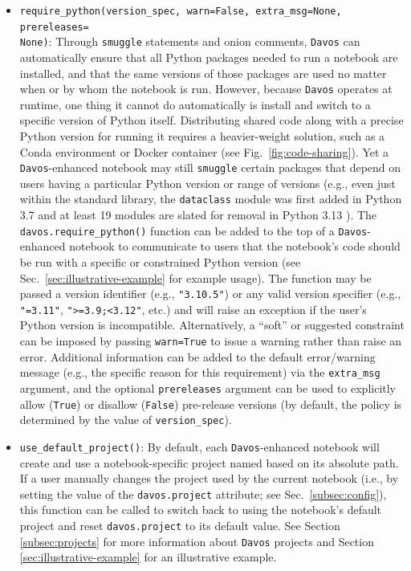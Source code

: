 \documentclass[preprint,12pt,a4paper]{elsarticle}
\begin{document}
\begin{itemize}
\item \texttt{require\_python(version\_spec, warn=False, extra\_msg=None, pre\-re\-leases=\\None)}: Through \texttt{smuggle} statements and onion comments, \texttt{Davos} can automatically ensure that all Python packages needed to run a notebook are installed, and that the same versions of those packages are used no matter when or by whom the notebook is run.
  However, because \texttt{Davos} operates at runtime, one thing it cannot do automatically is install and switch to a specific version of Python itself.
  Distributing shared code along with a precise Python version for running it requires a heavier-weight solution, such as a Conda environment or Docker container (see Fig.~\ref{fig:code-sharing}).
  Yet a \texttt{Davos}-enhanced notebook may still \texttt{smuggle} certain packages that depend on users having a particular Python version or range of versions (e.g., even just within the standard library, the \texttt{dataclass} module was first added in Python 3.7 \cite{Smit17} and at least 19 modules are slated for removal in Python 3.13 \cite{HeimCann19}).
  The \texttt{davos.require\_python()} function can be added to the top of a \texttt{Davos}-enhanced notebook to communicate to users that the notebook's code should be run with a specific or constrained Python version (see Sec.~\ref{sec:illustrative-example} for example usage).
  The function may be passed a version identifier (e.g., \texttt{"3.10.5"}) or any valid version specifier \cite{CoghStuf13} (e.g., \texttt{"\raisebox{0.5ex}{\texttildelow}=3.11"}, \texttt{">=3.9;<3.12"}, etc.) and will raise an exception if the user's Python version is incompatible.
  Alternatively, a ``soft'' or suggested constraint can be imposed by passing \texttt{warn=True} to issue a warning rather than raise an error.
  Additional information can be added to the default error/warning message (e.g., the specific reason for this requirement) via the \texttt{extra\_msg} argument, and the optional \texttt{prereleases} argument can be used to explicitly allow (\texttt{True}) or disallow (\texttt{False}) pre-release versions (by default, the policy is determined by the value of \texttt{version\_spec}).

\item \texttt{use\_default\_project()}: By default, each \texttt{Davos}-enhanced notebook will create and use a notebook-specific project named based on its absolute path.
  If a user manually changes the project used by the current notebook (i.e., by setting the value of the \texttt{davos.project} attribute; see Sec.~\ref{subsec:config}), this function can be called to switch back to using the notebook's default project and reset \texttt{davos.project} to its default value.
  See Section \ref{subsec:projects} for more information about \texttt{Davos} projects and Section \ref{sec:illustrative-example} for an illustrative example.

\end{itemize}
\end{document}
